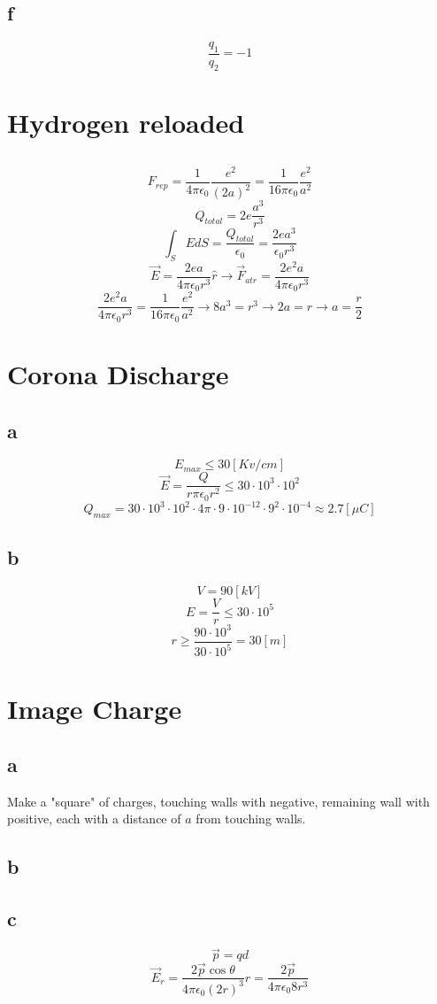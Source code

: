 \documentclass{article}
\begin{document}
\subsection{f}

\[
	\frac{q_1}{q_2} = -1
\]

\section{Hydrogen reloaded}

\subsection{}
\[
	F_{rep} = \frac{1}{4 \pi \epsilon_0} \frac{e^2}{(2 a)^2}
	= \frac{1}{16 \pi \epsilon_0} \frac{e^2}{a^2}
\]
\[
	Q_{total} = 2 e \frac{a^3}{r^3}
\]
\[
	\int_S E dS = \frac{Q_{total}}{\epsilon_0}
	= \frac{2 e a^3}{\epsilon_0 r^3}
\]
\[
	\vec{E} = \frac{2 e a}{4 \pi \epsilon_0 r^3} \hat{r}
	\to \vec{F}_{atr} = \frac{2 e^2 a}{4 \pi \epsilon_0 r^3}
\]
\[
	\frac{2 e^2 a}{4 \pi \epsilon_0 r^3}
	= \frac{1}{16 \pi \epsilon_0} \frac{e^2}{a^2}
	\to 8 a^3 = r^3
	\to 2 a = r
	\to a = \frac{r}{2}
\]

\section{Corona Discharge}

\subsection{a}

\[
	E_{max} \leq 30 [Kv/cm]
\]
\[
	\vec{E} = \frac{Q}{r \pi \epsilon_0 r^2} \leq 30 \cdot 10^3 \cdot 10^2
\]
\[
	Q_{max} = 30 \cdot 10^3 \cdot 10^2 \cdot 4 \pi \cdot 9 \cdot 10^{-12}
	\cdot 9^2 \cdot 10^{-4} \approx 2.7 [\mu C]
\]

\subsection{b}

\[
	V = 90 [kV]
\]
\[
	E = \frac{V}{r} \leq 30 \cdot 10^5
\]
\[
	r \geq \frac{90 \cdot 10^3}{30 \cdot 10^5} = 30 [m]
\]

\section{Image Charge}

\subsection{a}
Make a "square" of charges, touching walls with negative, remaining wall with
positive, each with a distance of \(a\) from touching walls.

\subsection{b}

\subsection{c}
\[
	\vec{p} = q d
\]
\[
	\vec{E}_r
	= \frac{2 \vec{p} \cos{\theta}}{4 \pi \epsilon_0 (2r)^3} \hat{r}
	= \frac{2 \vec{p}}{4 \pi \epsilon_0 8 r^3}
\]
\end{document}
